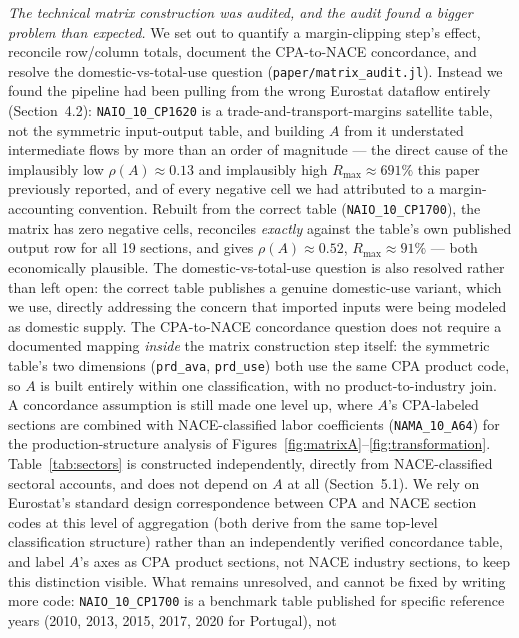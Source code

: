 \documentclass[11pt]{article}
\begin{document}
\emph{The technical matrix construction was audited, and the audit found
a bigger problem than expected.} We set out to quantify a margin-clipping
step's effect, reconcile row/column totals, document the CPA-to-NACE
concordance, and resolve the domestic-vs-total-use question
(\texttt{paper/matrix\_audit.jl}). Instead we found the pipeline had been
pulling from the wrong Eurostat dataflow entirely (Section~4.2):
\texttt{NAIO\_10\_CP1620} is a trade-and-transport-margins satellite
table, not the symmetric input-output table, and building $A$ from it
understated intermediate flows by more than an order of magnitude ---
the direct cause of the implausibly low $\rho(A)\approx0.13$ and
implausibly high $R_{\max}\approx691\%$ this paper previously reported,
and of every negative cell we had attributed to a margin-accounting
convention. Rebuilt from the correct table (\texttt{NAIO\_10\_CP1700}),
the matrix has zero negative cells, reconciles \emph{exactly} against
the table's own published output row for all 19 sections, and gives
$\rho(A)\approx0.52$, $R_{\max}\approx91\%$ --- both economically
plausible. The domestic-vs-total-use question is also resolved rather
than left open: the correct table publishes a genuine domestic-use
variant, which we use, directly addressing the concern that imported
inputs were being modeled as domestic supply. The CPA-to-NACE
concordance question does not require a documented mapping \emph{inside}
the matrix construction step itself: the symmetric table's two
dimensions (\texttt{prd\_ava}, \texttt{prd\_use}) both use the same CPA
product code, so $A$ is built entirely within one classification, with
no product-to-industry join. A concordance assumption is still made one
level up, where $A$'s CPA-labeled sections are combined with
NACE-classified labor coefficients (\texttt{NAMA\_10\_A64}) for the
production-structure analysis of Figures~\ref{fig:matrixA}--\ref{fig:transformation}.
Table~\ref{tab:sectors} is constructed independently, directly from
NACE-classified sectoral accounts, and does not depend on $A$ at all
(Section~5.1). We rely on
Eurostat's standard design correspondence between CPA and NACE section
codes at this level of aggregation (both derive from the same top-level
classification structure) rather than an independently verified
concordance table, and label $A$'s axes as CPA product sections, not
NACE industry sections, to keep this distinction visible. What remains
unresolved, and cannot be fixed by writing more code:
\texttt{NAIO\_10\_CP1700} is a benchmark table published for specific
reference years (2010, 2013, 2015, 2017, 2020 for Portugal), not
\end{document}
